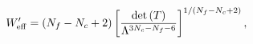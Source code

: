 \begin{equation}\label{Eq:ADSlike}
W^\prime_{\rm eff}=\left( N_f-N_c+2\right) \left[ 
\frac{
	\det \left(T\right)
}
{
	\Lambda^{3N_c-N_f-6}
} 
\right]^{1/(N_f-N_c+2)}, 
\end{equation}

